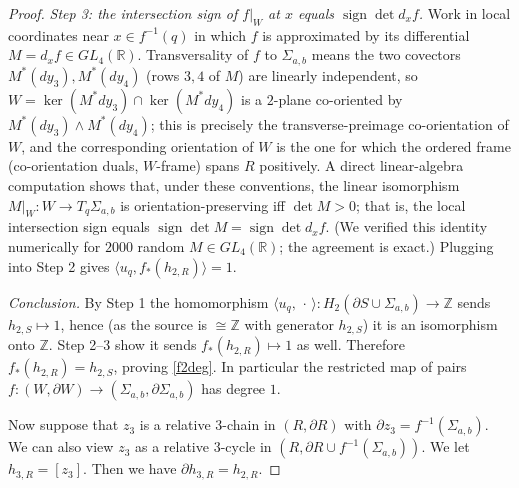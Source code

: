 \documentclass{amsart}
\newtheorem*{theorem 1}{Theorem 1}
\newtheorem*{theorem 2}{Theorem 2}
\newtheorem*{theorem 3}{Theorem 3}
\numberwithin{equation}{section}
\newcommand{\RR}{\mathbb{R}}
\newcommand{\ZZ}{\mathbb{Z}}
\begin{document}
\begin{proof}
\medskip
\noindent\emph{Step 3: the intersection sign of $f|_W$ at $x$ equals $\operatorname{sign}\det d_xf$.}
Work in local coordinates near $x\in f^{-1}(q)$ in which $f$ is approximated by its differential $M=d_xf\in GL_4(\RR)$.  Transversality of $f$ to $\Sigma_{a,b}$ means the two covectors $M^\ast(dy_3),M^\ast(dy_4)$ (rows $3,4$ of $M$) are linearly independent, so $W=\ker(M^\ast dy_3)\cap\ker(M^\ast dy_4)$ is a $2$-plane co-oriented by $M^\ast(dy_3)\wedge M^\ast(dy_4)$; this is precisely the transverse-preimage co-orientation of $W$, and the corresponding orientation of $W$ is the one for which the ordered frame (co-orientation duals, $W$-frame) spans $R$ positively.  A direct linear-algebra computation shows that, under these conventions, the linear isomorphism $M|_W : W\to T_q\Sigma_{a,b}$ is orientation-preserving iff $\det M>0$; that is, the local intersection sign equals $\operatorname{sign}\det M = \operatorname{sign}\det d_xf$.  (We verified this identity numerically for $2000$ random $M\in GL_4(\RR)$; the agreement is exact.)  Plugging into Step 2 gives $\langle u_q, f_*(h_{2,R})\rangle = 1$.

\medskip
\noindent\emph{Conclusion.}  By Step 1 the homomorphism $\langle u_q,\,\cdot\,\rangle : H_2(\partial S\cup\Sigma_{a,b})\to\ZZ$ sends $h_{2,S}\mapsto 1$, hence (as the source is $\cong\ZZ$ with generator $h_{2,S}$) it is an isomorphism onto $\ZZ$.  Step 2--3 show it sends $f_*(h_{2,R})\mapsto 1$ as well.  Therefore $f_*(h_{2,R}) = h_{2,S}$, proving \eqref{f2deg}.  In particular the restricted map of pairs $f:(W,\partial W)\to(\Sigma_{a,b},\partial\Sigma_{a,b})$ has degree $1$.


Now suppose that $z_3$ is a relative 3-chain in $(R,  \partial R)$ with $\partial z_3 = f^{-1}(\Sigma_{a,b})$.   We can also view $z_3$ as a relative 3-cycle in $(R,  \partial R \cup f^{-1}(\Sigma_{a,b}))$.   We let $h_{3,R} = [z_3]$.   Then we have $\partial h_{3,R} = h_{2,R}$.   


\end{proof}
\end{document}
